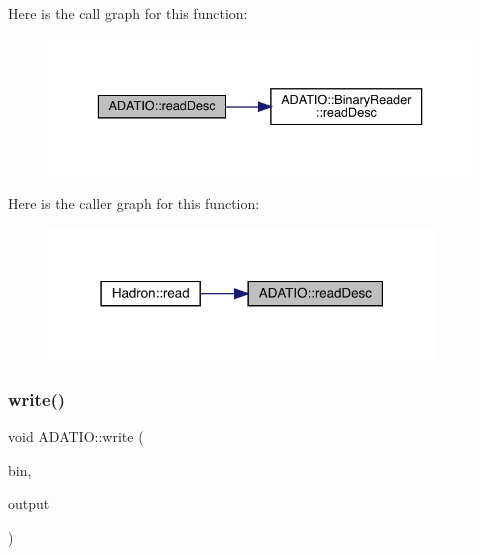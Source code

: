 Here is the call graph for this function\+:\nopagebreak
\begin{figure}[H]
\begin{center}
\leavevmode
\includegraphics[width=336pt]{d0/dba/namespaceADATIO_af57306a140489d28cd8fa1107d585906_cgraph}
\end{center}
\end{figure}
Here is the caller graph for this function\+:\nopagebreak
\begin{figure}[H]
\begin{center}
\leavevmode
\includegraphics[width=291pt]{d0/dba/namespaceADATIO_af57306a140489d28cd8fa1107d585906_icgraph}
\end{center}
\end{figure}
\mbox{\label{namespaceADATIO_a12d01adc4b592d85f0f5f5c101205c08}} 
\subsubsection{\texorpdfstring{write()}{write()}\hspace{0.1cm}{\footnotesize\ttfamily [1/25]}}
{\footnotesize\ttfamily void A\+D\+A\+T\+I\+O\+::write (\begin{DoxyParamCaption}\item[{\mbox{\hyperlink{classADATIO_1_1BinaryWriter}{Binary\+Writer}} \&}]{bin,  }\item[{const std\+::string \&}]{output }\end{DoxyParamCaption})}

